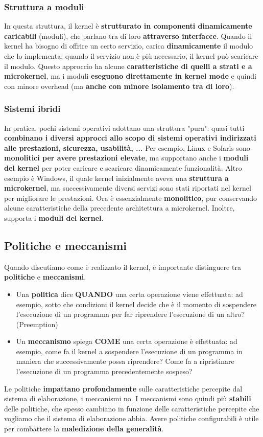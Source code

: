 \documentclass[12pt]{article}
\begin{document}
\subsubsection{Struttura a moduli}
In questa struttura, il kernel è \textbf{strutturato in componenti dinamicamente caricabili} (moduli), che parlano tra di loro \textbf{attraverso interfacce}.
Quando il kernel ha bisogno di offrire un certo servizio, carica \textbf{dinamicamente} il modulo che lo implementa; quando il servizio non è più necessario, il kernel può scaricare il modulo.
Questo approccio ha alcune \textbf{caratteristiche di quelli a strati e a microkernel}, ma i moduli \textbf{eseguono direttamente in kernel mode} e quindi con minore overhead (ma \textbf{anche con minore isolamento tra di loro}).
\subsubsection{Sistemi ibridi}
In pratica, pochi sistemi operativi adottano una struttura "pura": quasi tutti \textbf{combinano i diversi approcci allo scopo di sistemi operativi indirizzati alle prestazioni, sicurezza, usabilità, ...}
Per esempio, Linux e Solaris sono \textbf{monolitici per avere prestazioni elevate}, ma supportano anche i \textbf{moduli del kernel} per poter caricare e scaricare dinamicamente funzionalità.
Altro esempio è Windows, il quale kernel inizialmente aveva una \textbf{struttura a microkernel}, ma successivamente diversi servizi sono stati riportati nel kernel per migliorare le prestazioni.
Ora è essenzialmente \textbf{monolitico}, pur conservando alcune caratteristiche della precedente architettura a microkernel. Inoltre, supporta i \textbf{moduli del kernel}.
\subsection{Politiche e meccanismi}
Quando discutiamo come è realizzato il kernel, è importante distinguere tra \textbf{politiche} e \textbf{meccanismi}.
\begin{itemize}
    \item Una \textbf{politica} dice \textbf{QUANDO} una certa operazione viene effettuata: ad esempio, sotto che condizioni il kernel decide che è il momento di sospendere l'esecuzione di un programma per far riprendere l'esecuzione di un altro? (Preemption)
    \item Un \textbf{meccanismo} spiega \textbf{COME} una certa operazione è effettuata: ad esempio, come fa il kernel a sospendere l'esecuzione di un programma in maniera che successivamente possa riprendere? Come fa a ripristinare l'esecuzione di un programma precedentemente sospeso?
\end{itemize}
Le politiche \textbf{impattano profondamente} sulle caratteristiche percepite dal sistema di elaborazione, i meccanismi no.
I meccanismi sono quindi più \textbf{stabili} delle politiche, che spesso cambiano in funzione delle caratteristiche percepite che vogliamo che il sistema di elaborazione abbia.
Avere politiche configurabili è utile per combattere la \textbf{maledizione della generalità}.
\end{document}
